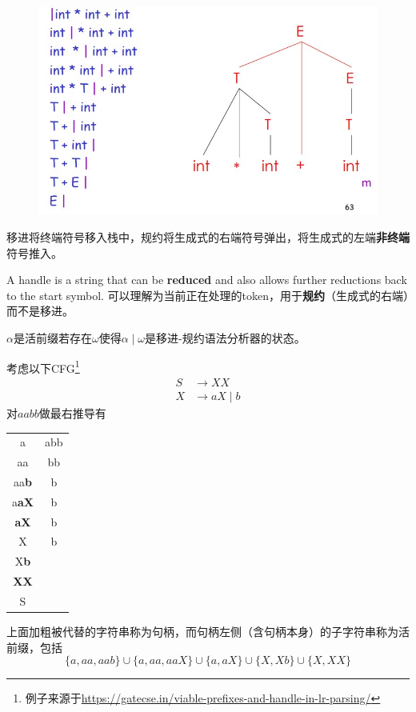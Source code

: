\begin{figure}[H]
\centering
\includegraphics[width=0.6\linewidth]{fig/shift-reduce.jpg}
\end{figure}
移进将终端符号移入栈中，规约将生成式的右端符号弹出，将生成式的左端\textbf{非终端}符号推入。

\begin{definition}[句柄(handle)]
A handle is a string that can be \textbf{reduced} and also allows further reductions back to the start symbol.
可以理解为当前正在处理的token，用于\textbf{规约}（生成式的右端）而不是移进。
\end{definition}

\begin{definition}
$\alpha$是活前缀若存在$\omega$使得$\alpha\mid\omega$是移进-规约语法分析器的状态。
\end{definition}

\begin{example}
考虑以下CFG\footnote{例子来源于\url{https://gatecse.in/viable-prefixes-and-handle-in-lr-parsing/}}
\[\begin{aligned}
S &\to XX\\
X &\to aX\mid b
\end{aligned}\]
对$aabb$做最右推导有
\begin{center}
\begin{tabular}{|cc|}\hline
a & abb\\
aa & bb\\
aa\textbf{b} & b\\
a\textbf{aX} & b\\
\textbf{aX} & b\\
X & b\\
X\textbf{b} & \\
\textbf{XX} & \\
S & \\\hline
\end{tabular}
\end{center}
上面加粗被代替的字符串称为句柄，而句柄左侧（含句柄本身）的子字符串称为活前缀，包括
\[\{a,aa,aab\}\cup \{a,aa,aaX\} \cup \{a,aX\} \cup \{X,Xb\} \cup \{X,XX\}\]
\end{example}

